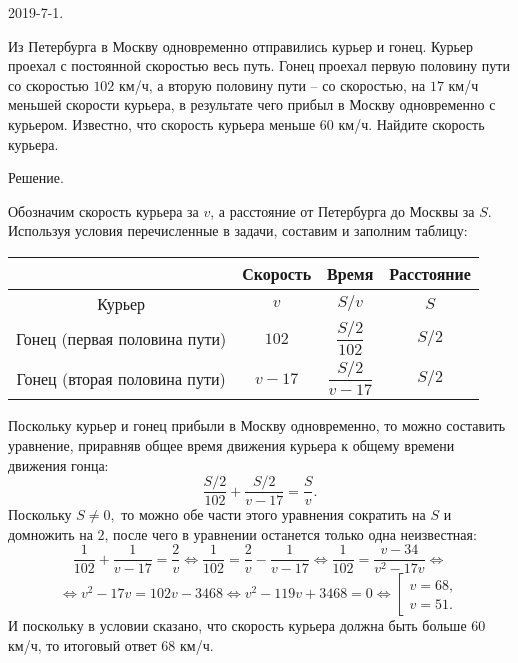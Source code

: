 
2019-7-1.

Из Петербурга в Москву одновременно отправились курьер и гонец. Курьер проехал с постоянной скоростью весь путь. Гонец проехал первую половину пути со скоростью $102$ км/ч, а вторую половину пути – со
скоростью, на $17$ км/ч меньшей скорости курьера, в результате чего прибыл в Москву одновременно с курьером.
Известно, что скорость курьера меньше $60$ км/ч. Найдите скорость курьера.

Решение.

Обозначим скорость курьера за $v$, а расстояние от Петербурга до Москвы за $S$. Используя условия перечисленные в задачи, составим и заполним таблицу:

\center
\renewcommand\arraystretch{3}
\begin{tabular}{|c|c|c|c|}
\hline
&Скорость& Время & Расстояние\\\hline
Курьер&$v$& $S/v$ & $S$\\\hline
Гонец (первая половина пути)&$102$& $\dfrac{S/2}{102}$ & $S/2$\\\hline
Гонец (вторая половина пути)&$v-17$& $\dfrac{S/2}{v-17}$ & $S/2$\\\hline
\end{tabular}
\flushleft
\renewcommand\arraystretch{1.5}

Поскольку курьер и гонец прибыли в Москву одновременно, то можно составить уравнение, приравняв общее время движения курьера к общему времени движения гонца:
$$\dfrac{S/2}{102}+\dfrac{S/2}{v-17}=\dfrac{S}{v}.$$
Поскольку $S\neq 0,$ то можно обе части этого уравнения сократить на $S$ и домножить на $2$, после чего в уравнении останется только одна неизвестная:
$$\dfrac{1}{102}+\dfrac{1}{v-17}=\dfrac{2}{v}
\Leftrightarrow \dfrac{1}{102}=\dfrac{2}{v}-\dfrac{1}{v-17} \Leftrightarrow \dfrac{1}{102}=\dfrac{v-34}{v^2-17v}\Leftrightarrow$$
$$\Leftrightarrow v^2-17v = 102v-3468 \Leftrightarrow v^2-119v +3468=0 \Leftrightarrow\left[\begin{array}{ll}v= 68,\\v=51.\end{array}\right.$$
И поскольку в условии сказано, что скорость курьера должна быть больше $60$ км/ч, то итоговый ответ $68$ км/ч.

